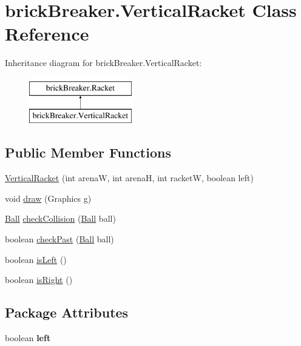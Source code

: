 \hypertarget{classbrick_breaker_1_1_vertical_racket}{
\section{brickBreaker.VerticalRacket Class Reference}
\label{classbrick_breaker_1_1_vertical_racket}
}
Inheritance diagram for brickBreaker.VerticalRacket:\begin{figure}[H]
\begin{center}
\leavevmode
\includegraphics[height=2cm]{classbrick_breaker_1_1_vertical_racket}
\end{center}
\end{figure}
\subsection*{Public Member Functions}
\begin{DoxyCompactItemize}
\item 
\hyperlink{classbrick_breaker_1_1_vertical_racket_a2131363067760b416b9a857cba22c8ae}{VerticalRacket} (int arenaW, int arenaH, int racketW, boolean left)
\item 
void \hyperlink{classbrick_breaker_1_1_vertical_racket_ac455ce02602cbf621997042439809ee5}{draw} (Graphics g)
\item 
\hyperlink{classbrick_breaker_1_1_ball}{Ball} \hyperlink{classbrick_breaker_1_1_vertical_racket_a8893265e40d1d8946702d26f8c07887b}{checkCollision} (\hyperlink{classbrick_breaker_1_1_ball}{Ball} ball)
\item 
boolean \hyperlink{classbrick_breaker_1_1_vertical_racket_ac9edcb855d560fa5771da4e12abb4e71}{checkPast} (\hyperlink{classbrick_breaker_1_1_ball}{Ball} ball)
\item 
boolean \hyperlink{classbrick_breaker_1_1_vertical_racket_aa1af985933bd997bba1951e38107a5a5}{isLeft} ()
\item 
boolean \hyperlink{classbrick_breaker_1_1_vertical_racket_ad8c73b81712009be68fa497c48b71012}{isRight} ()
\end{DoxyCompactItemize}
\subsection*{Package Attributes}
\begin{DoxyCompactItemize}
\item 
\hypertarget{classbrick_breaker_1_1_vertical_racket_a044c4e4a5a331d2b51f1a4ee3d2e2b2e}{
boolean {\bfseries left}}
\label{classbrick_breaker_1_1_vertical_racket_a044c4e4a5a331d2b51f1a4ee3d2e2b2e}

\end{DoxyCompactItemize}


